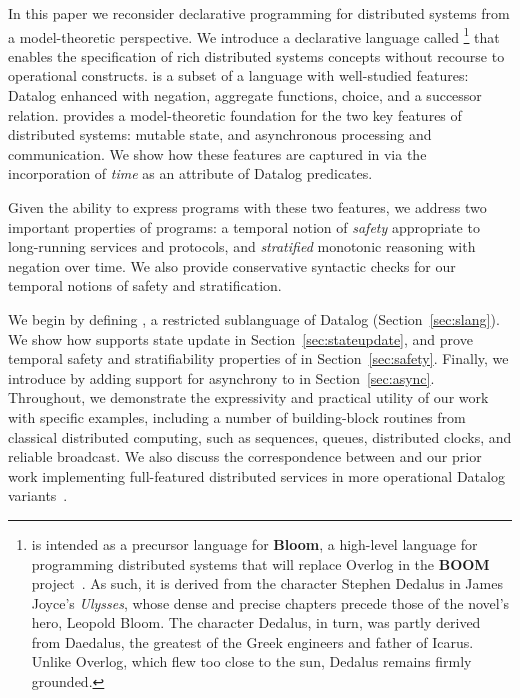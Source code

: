 In this paper we reconsider declarative programming for distributed
systems from a model-theoretic perspective. We introduce a declarative
language called \lang\footnote{\small \lang is intended as a precursor
  language for \textbf{Bloom}, a high-level language for programming
  distributed systems that will replace Overlog in the \textbf{BOOM}
  project~\cite{boom-eurosys}.  As such, it is derived from the
  character Stephen Dedalus in James Joyce's \emph{Ulysses}, whose
  dense and precise chapters precede those of the novel's hero,
  Leopold Bloom.  The character Dedalus, in turn, was partly derived
  from Daedalus, the greatest of the Greek engineers and father of
  Icarus.  Unlike Overlog, which flew too close to the sun, Dedalus
  remains firmly grounded.  } that enables the specification of rich
distributed systems concepts without recourse to operational
constructs.  \lang is a subset of a language with well-studied
features: Datalog enhanced with negation, aggregate functions, choice,
and a successor relation.  \lang provides a model-theoretic foundation
for the two key features of distributed systems: mutable state, and
asynchronous processing and communication.  We show how these features
are captured in \lang via the incorporation of {\em time} as an
attribute of Datalog predicates.

Given the ability to express programs with these two features, we
address two important properties of \lang programs: a temporal
notion of {\em safety} appropriate to long-running services and
protocols, and {\em stratified} monotonic reasoning with negation over
time.  We
also provide conservative syntactic checks for our temporal notions of
safety and stratification.

We begin by defining \slang, a restricted sublanguage of Datalog
(Section~\ref{sec:slang}). We show how \slang supports state update in
Section~\ref{sec:stateupdate}, and prove temporal safety and
stratifiability properties of \slang in Section~\ref{sec:safety}.
Finally, we introduce \lang by adding
support for asynchrony to \slang in
Section~\ref{sec:async}. Throughout, we demonstrate the expressivity
and practical utility of our work with specific examples, including a
number of building-block routines from classical distributed
computing, such as sequences, queues, distributed clocks, and reliable
broadcast.  We also discuss the correspondence between \lang and our
prior work implementing full-featured distributed services in 
more operational Datalog variants~\cite{boom-eurosys,Loo2009-CACM}.

